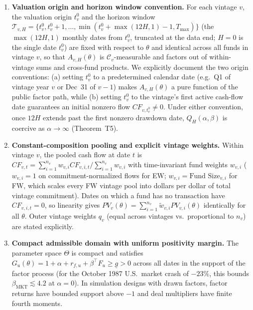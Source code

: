 \documentclass[11pt]{article}
\newcommand{\C}{\mathcal{C}}
\begin{document}
\begin{enumerate}[label=\textbf{A\arabic*.}]
\item \textbf{Valuation origin and horizon window convention.} For each vintage $v$, the valuation origin $t_v^0$ and the horizon window $\mathcal{T}_{v,H}=\{t_v^0,t_v^0+1,\dots,\min(t_v^0+\max(12H,1)-1,T_{\max})\}$ (the $\max(12H,1)$ monthly dates from $t_v^0$, truncated at the data end; $H=0$ is the single date $t_v^0$) are fixed with respect to $\theta$ and identical across all funds in vintage $v$, so that $A_{v,H}(\theta)$ is $\C_v$-measurable and factors out of within-vintage sums and cross-fund products. We explicitly document the two origin conventions: (a) setting $t_v^0$ to a predetermined calendar date (e.g.\ Q1 of vintage year $v$ or Dec~31 of $v-1$) makes $A_{v,H}(\theta)$ a pure function of the public factor path, while (b) setting $t_v^0$ to the vintage's first active cash-flow date guarantees an initial nonzero flow $CF_{v,t_v^0}\neq 0$. Under either convention, once $12H$ extends past the first nonzero drawdown date, $Q_H(\alpha,\beta)$ is coercive as $\alpha\to\infty$ (Theorem~T5).

\item \textbf{Constant-composition pooling and explicit vintage weights.} Within vintage $v$, the pooled cash flow at date $t$ is $CF_{v,t}=\sum_{i=1}^{n_v}w_{v,i}CF_{v,i,t}/\sum_{i=1}^{n_v}w_{v,i}$ with time-invariant fund weights $w_{v,i}$ ($w_{v,i}=1$ on commitment-normalized flows for EW; $w_{v,i}=\text{Fund Size}_{v,i}$ for FW, which scales every FW vintage pool into dollars per dollar of total vintage commitment). Dates on which a fund has no transaction have $CF_{v,i,t}=0$, so linearity gives $PV_v(\theta)=\sum_{i=1}^{n_v}\tilde w_{v,i}PV_{v,i}(\theta)$ identically for all $\theta$. Outer vintage weights $q_v$ (equal across vintages vs.\ proportional to $n_v$) are stated explicitly.

\item \textbf{Compact admissible domain with uniform positivity margin.} The parameter space $\Theta$ is compact and satisfies $G_u(\theta)=1+\alpha+r_{f,u}+\beta^\top F_u\ge\underline g>0$ across all dates in the support of the factor process (for the October 1987 U.S.\ market crash of $-23\%$, this bounds $\beta_{\mathrm{MKT}}\lesssim 4.2$ at $\alpha=0$). In simulation designs with drawn factors, factor returns have bounded support above $-1$ and deal multipliers have finite fourth moments.


\end{enumerate}
\end{document}
